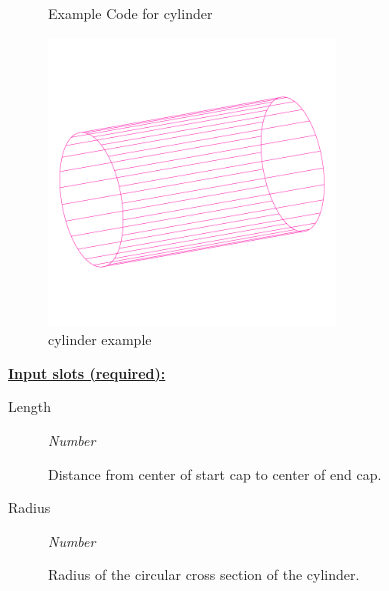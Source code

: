 \documentclass [11pt]{book}
\begin{document}
\begin{itemize}
\begin{figure}
\begin{lrbox}{\boxedverb}
\begin{minipage}{\linewidth}
{\begin{verbatim}
\end{verbatim}}
\end{minipage}
\end{lrbox}
\fbox{\usebox{\boxedverb}}

\caption{Example Code for cylinder}

\label{fig:example-code-cylinder}

\end{figure}

\begin{figure}
\begin{center}
\includegraphics[width=3in,height=3in]{../images/example-cylinder.pdf}
\end{center}

\caption{cylinder example}

\label{fig:cylinder}

\end{figure}





\textbf{
\underline{Input slots (required):}}

\begin{description}

\item [Length]
\emph{Number}

 Distance from center of start cap to center of end cap.




\item [Radius]
\emph{Number}

 Radius of the circular cross section of the cylinder.




\end{description}







\end{itemize}
\end{document}

